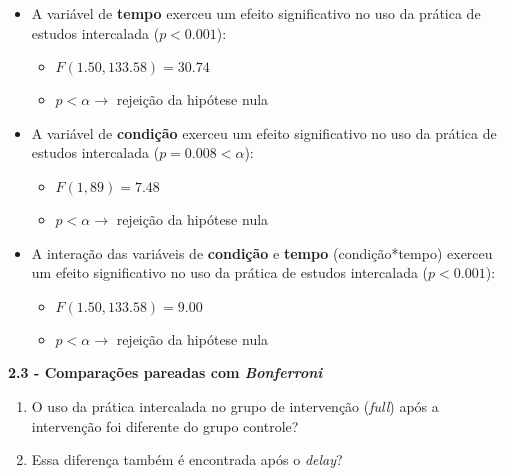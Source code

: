 \documentclass[
]{article}
\providecommand{\tightlist}{%
  \setlength{\itemsep}{0pt}\setlength{\parskip}{0pt}}
\begin{document}
\begin{itemize}
\item
  A variável de \textbf{tempo} exerceu um efeito significativo no uso da
  prática de estudos intercalada (\(p < 0.001\)):

  \begin{itemize}
  \tightlist
  \item
    \(F(1.50, 133.58) = 30.74\)
  \item
    \(p < \alpha \rightarrow\) rejeição da hipótese nula
  \end{itemize}
\end{itemize}

\begin{itemize}
\item
  A variável de \textbf{condição} exerceu um efeito significativo no uso
  da prática de estudos intercalada (\(p = 0.008 < \alpha\)):

  \begin{itemize}
  \tightlist
  \item
    \(F(1, 89) = 7.48\)
  \item
    \(p < \alpha \rightarrow\) rejeição da hipótese nula
  \end{itemize}
\end{itemize}

\begin{itemize}
\item
  A interação das variáveis de \textbf{condição} e \textbf{tempo}
  (condição*tempo) exerceu um efeito significativo no uso da prática de
  estudos intercalada (\(p < 0.001\)):

  \begin{itemize}
  \tightlist
  \item
    \(F(1.50, 133.58) = 9.00\)
  \item
    \(p < \alpha \rightarrow\) rejeição da hipótese nula
  \end{itemize}
\end{itemize}

\textbf{2.3 - Comparações pareadas com \emph{Bonferroni}}

\begin{enumerate}
\def\labelenumi{\arabic{enumi}.}
\tightlist
\item
  O uso da prática intercalada no grupo de intervenção (\emph{full})
  após a intervenção foi diferente do grupo controle?
\item
  Essa diferença também é encontrada após o \emph{delay}?
\end{enumerate}
\end{document}
